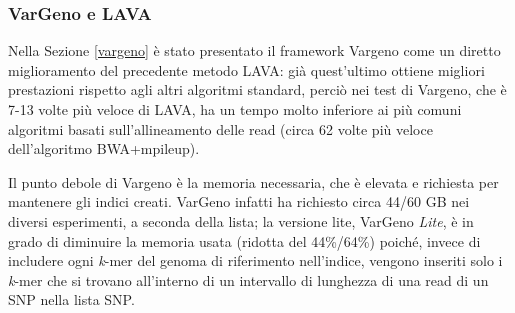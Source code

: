 \documentclass[../main.tex]{subfiles}
\begin{document}

\subsubsection{VarGeno e LAVA}

Nella Sezione \ref{vargeno} è stato presentato il framework Vargeno come un diretto miglioramento del precedente metodo LAVA: già quest'ultimo ottiene migliori prestazioni rispetto agli altri algoritmi standard, perciò nei test di \cite{sun-medvedev2018vargeno} Vargeno, che è 7-13 volte più veloce di LAVA, ha un tempo molto inferiore ai più comuni algoritmi basati sull'allineamento delle read (circa 62 volte più veloce dell'algoritmo BWA+mpileup). 

Il punto debole di Vargeno è la memoria necessaria, che è elevata e richiesta per mantenere gli indici creati. VarGeno infatti ha richiesto circa 44/60 GB nei diversi esperimenti, a seconda della lista; la versione lite, VarGeno \textit{Lite}, è in grado di diminuire la memoria usata (ridotta del 44\%/64\%) poiché, invece di includere ogni \textit{k}-mer del genoma di riferimento nell'indice, vengono inseriti solo i \textit{k}-mer che si trovano all'interno di un intervallo di lunghezza di una read di un SNP nella lista SNP. 
\end{document}
